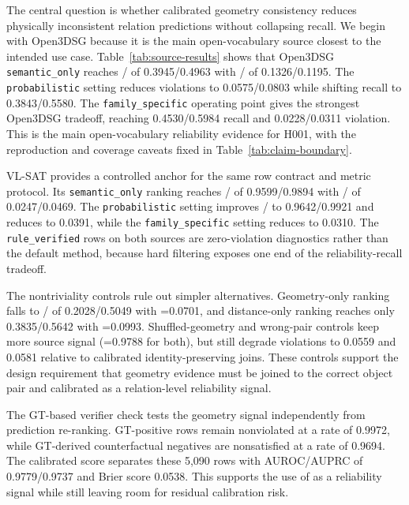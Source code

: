 The central question is whether calibrated geometry consistency reduces
physically inconsistent relation predictions without collapsing recall. We
begin with Open3DSG because it is the main open-vocabulary source closest to
the intended use case. Table~\ref{tab:source-results} shows that Open3DSG
\texttt{semantic\_only} reaches / of 0.3945/0.4963 with
/ of 0.1326/0.1195. The
\texttt{probabilistic} setting reduces violations to 0.0575/0.0803 while
shifting recall to 0.3843/0.5580. The \texttt{family\_specific} operating
point gives the strongest Open3DSG tradeoff, reaching 0.4530/0.5984 recall and
0.0228/0.0311 violation. This is the main open-vocabulary reliability evidence
for H001, with the reproduction and coverage caveats fixed in
Table~\ref{tab:claim-boundary}.

VL-SAT provides a controlled anchor for the same row contract and metric
protocol. Its \texttt{semantic\_only} ranking reaches / of
0.9599/0.9894 with / of 0.0247/0.0469. The
\texttt{probabilistic} setting improves / to 0.9642/0.9921
and reduces  to 0.0391, while the \texttt{family\_specific} setting
reduces  to 0.0310. The \texttt{rule\_verified} rows on both sources
are zero-violation diagnostics rather than the default method, because hard
filtering exposes one end of the reliability-recall tradeoff.

The nontriviality controls rule out simpler alternatives. Geometry-only ranking
falls to / of 0.2028/0.5049 with =0.0701, and
distance-only ranking reaches only 0.3835/0.5642 with =0.0993.
Shuffled-geometry and wrong-pair controls keep more source signal
(=0.9788 for both), but still degrade violations to 0.0559 and 0.0581
relative to calibrated identity-preserving joins. These controls support the
design requirement that geometry evidence must be joined to the correct object
pair and calibrated as a relation-level reliability signal.

The GT-based verifier check tests the geometry signal independently from
prediction re-ranking. GT-positive rows remain nonviolated at a rate of 0.9972,
while GT-derived counterfactual negatives are nonsatisfied at a rate of 0.9694.
The calibrated \pgeom{} score separates these 5,090 rows with AUROC/AUPRC of
0.9779/0.9737 and Brier score 0.0538. This supports the use of \pgeom{} as a
reliability signal while still leaving room for residual calibration risk.

